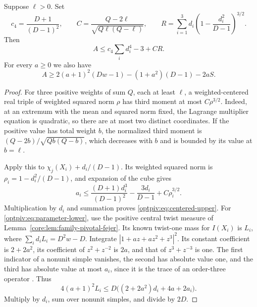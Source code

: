 \begin{lemma}\label{optpiv:lem:centered}
Suppose $\ell>0$. Set
\[
 c_4=\frac{D+1}{(D-1)^2},\qquad
 C=\frac{Q-2\ell}{\sqrt{Q\ell(Q-\ell)}},\qquad
 R=\sum_{i=1}^3d_i\left(1-\frac{d_i^2}{D-1}\right)^{3/2}.
\]
Then
\begin{equation}\label{optpiv:eq:centered-upper}
 A\le c_4\sum_i d_i^4-3+CR.
\end{equation}
For every $a\ge0$ we also have
\begin{equation}\label{optpiv:eq:parameter-lower}
 A\ge2(a+1)^2(Dw-1)-(1+a^2)(D-1)-2aS.
\end{equation}
\end{lemma}
\begin{proof}
For three positive weights of sum $Q$, each at least $\ell$, a
weighted-centered real triple of weighted squared norm $\rho$ has
third moment at most $C\rho^{3/2}$. Indeed, at an extremum with the mean
and squared norm fixed, the Lagrange multiplier equation is quadratic,
so there are at most two distinct coordinates. If the positive value
has total weight $b$, the normalized third moment is
$(Q-2b)/\sqrt{Qb(Q-b)}$, which decreases with $b$ and is bounded by its
value at $b=\ell$.

Apply this to $\chi_j(X_i)+d_i/(D-1)$. Its weighted squared norm is
$\rho_i=1-d_i^2/(D-1)$, and expansion of the cube gives
\[
 a_i\le\frac{(D+1)d_i^3}{(D-1)^2}
       -\frac{3d_i}{D-1}+C\rho_i^{3/2}.
\]
Multiplication by $d_i$ and summation proves
\eqref{optpiv:eq:centered-upper}. For
\eqref{optpiv:eq:parameter-lower}, use the positive central twist
measure of Lemma~\ref{core:lem:family-pivotal-fejer}. Its known twist-one
mass for $I(X_i)$ is $L_i$, where
$\sum_i d_iL_i=D^2w-D$. Integrate $|1+az+az^2+z^3|^2$.
Its constant coefficient is $2+2a^2$, its coefficient of
$z^2+z^{-2}$ is $2a$, and that of $z^3+z^{-3}$ is one.
The first indicator of a nonunit simple vanishes, the second has
absolute value one, and the third has absolute value at most $a_i$,
since it is the trace of an order-three operator
\cite[Theorem~5.1]{NSHigher}. Thus
\[
 4(a+1)^2L_i\le D\bigl((2+2a^2)d_i+4a+2a_i\bigr).
\]
Multiply by $d_i$, sum over nonunit simples, and divide by $2D$.
\end{proof}

